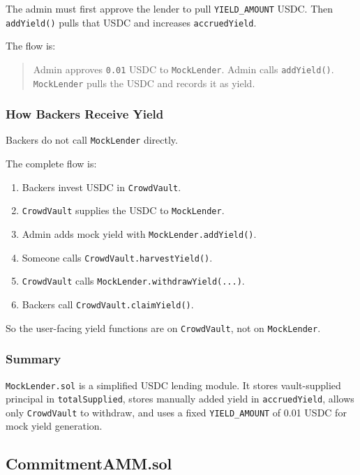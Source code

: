 \documentclass[11pt,a4paper]{article}
\begin{document}
The admin must first approve the lender to pull \texttt{YIELD\_AMOUNT} USDC. Then \texttt{addYield()} pulls that USDC and increases \texttt{accruedYield}.

The flow is:

\begin{quote}
Admin approves \texttt{0.01} USDC to \texttt{MockLender}. Admin calls \texttt{addYield()}. \texttt{MockLender} pulls the USDC and records it as yield.
\end{quote}

\subsubsection{How Backers Receive Yield}

Backers do not call \texttt{MockLender} directly.

The complete flow is:

\begin{enumerate}
  \item Backers invest USDC in \texttt{CrowdVault}.
  \item \texttt{CrowdVault} supplies the USDC to \texttt{MockLender}.
  \item Admin adds mock yield with \texttt{MockLender.addYield()}.
  \item Someone calls \texttt{CrowdVault.harvestYield()}.
  \item \texttt{CrowdVault} calls \texttt{MockLender.withdrawYield(...)}.
  \item Backers call \texttt{CrowdVault.claimYield()}.
\end{enumerate}

So the user-facing yield functions are on \texttt{CrowdVault}, not on \texttt{MockLender}.

\subsubsection{Summary}

\texttt{MockLender.sol} is a simplified USDC lending module. It stores vault-supplied principal in \texttt{totalSupplied}, stores manually added yield in \texttt{accruedYield}, allows only \texttt{CrowdVault} to withdraw, and uses a fixed \texttt{YIELD\_AMOUNT} of 0.01 USDC for mock yield generation.

\subsection{CommitmentAMM.sol}
\end{document}
